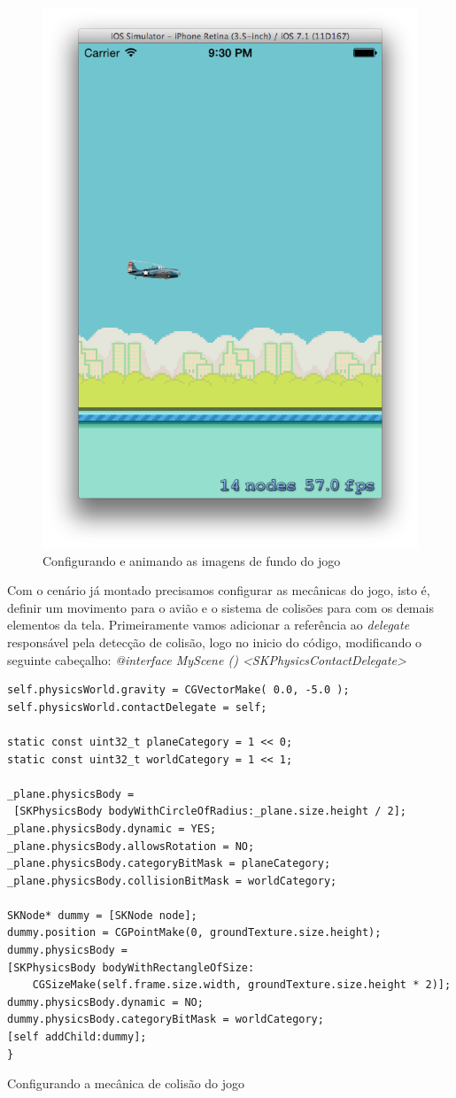 \documentclass[a4paper,12pt,brazil,oneside]{book}
\begin{document}
\begin{figure}[H]
  \centering
  \includegraphics[width=.75\textwidth]{figuras/6/plane5.png}
  \caption{Configurando e animando as imagens de fundo do jogo}
  \label{fig:a}
\end{figure}

Com o cenário já montado precisamos configurar as mecânicas do jogo, isto é, definir um movimento para o avião e o sistema de colisões para com os demais elementos da tela.
Primeiramente vamos adicionar a referência ao  \emph{delegate} responsável pela detecção de colisão, logo no inicio do código, modificando o seguinte cabeçalho: \emph{@interface MyScene () <SKPhysicsContactDelegate>}
 
\begin{listing}[H]
\begin{verbatim}
self.physicsWorld.gravity = CGVectorMake( 0.0, -5.0 );
self.physicsWorld.contactDelegate = self;
        
static const uint32_t planeCategory = 1 << 0;
static const uint32_t worldCategory = 1 << 1;

_plane.physicsBody = 
 [SKPhysicsBody bodyWithCircleOfRadius:_plane.size.height / 2];
_plane.physicsBody.dynamic = YES;
_plane.physicsBody.allowsRotation = NO;
_plane.physicsBody.categoryBitMask = planeCategory;
_plane.physicsBody.collisionBitMask = worldCategory;
 
SKNode* dummy = [SKNode node];
dummy.position = CGPointMake(0, groundTexture.size.height);
dummy.physicsBody = 
[SKPhysicsBody bodyWithRectangleOfSize:
	CGSizeMake(self.frame.size.width, groundTexture.size.height * 2)];
dummy.physicsBody.dynamic = NO;
dummy.physicsBody.categoryBitMask = worldCategory;
[self addChild:dummy];       
}
\end{verbatim}
\caption{Configurando a mecânica de colisão do jogo}
\end{listing}
\end{document}
